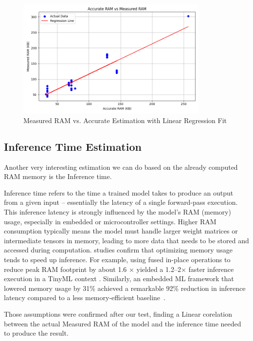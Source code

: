 \begin{figure}[ht]
  \centering
  \includegraphics[width=0.85\textwidth]{Pictures/ram_accurate_vs_measured.png}
  \caption{Measured RAM vs. Accurate Estimation with Linear Regression Fit}
  \label{fig:ram-linear-regression}
\end{figure}



\subsection{Inference Time Estimation}
Another very interesting estimation we can do based on the already computed RAM memory is the Inference time.

Inference time refers to the time a trained model takes to produce an output from a given input – essentially the latency of a single forward-pass execution. This inference latency is strongly influenced by the model’s RAM (memory) usage, especially in embedded or microcontroller settings. Higher RAM consumption typically means the model must handle larger weight matrices or intermediate tensors in memory, leading to more data that needs to be stored and accessed during computation.
studies confirm that optimizing memory usage tends to speed up inference. For example, using fused in-place operations to reduce peak RAM footprint by about 1.6 × yielded a 1.2–2× faster inference execution in a TinyML context \cite{inferenceTime1}. Similarly, an embedded ML framework that lowered memory usage by 31\% achieved a remarkable 92\% reduction in inference latency compared to a less memory-efficient baseline~\cite{inferenceTime1}.


Those assumptions were confirmed after our test, finding a Linear corelation between the actual Measured RAM of the model and the inference time needed to produce the result.

